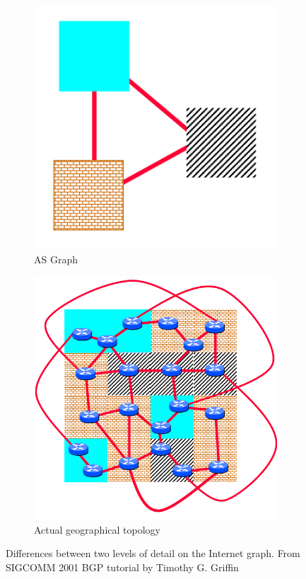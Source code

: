 \begin{figure}[ht]
     \centering
     \begin{subfigure}[b]{0.45\textwidth}
         \centering
         \includegraphics[width=\textwidth]{images/BGP/ASTopology.png}
		 \caption{\ac{AS} Graph}
         \label{fig:as_graph}
     \end{subfigure}
     \hfill
     \begin{subfigure}[b]{0.45\textwidth}
         \centering
         \includegraphics[width=\textwidth]{images/BGP/InternetTopology.png}
		 \caption{Actual geographical topology}
         \label{fig:actual_topology}
     \end{subfigure}
		\caption{Differences between two levels of detail on the Internet graph.
		 From SIGCOMM 2001 BGP tutorial by Timothy G. Griffin}
        \label{fig:astopology_vs_internet}
\end{figure}

